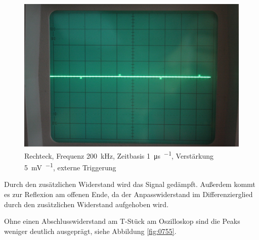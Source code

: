 \begin{figure}[htbp]
	\centering
	\begin{minipage}{.45\linewidth}
	\end{minipage}
	\hfill
	\begin{minipage}{.45\linewidth}
	\includegraphics[width=\linewidth]{Fotos/IMG_0753-1500.jpg}
	\end{minipage}
	\caption{%
		Rechteck, Frequenz \SI{200}{\kilo\hertz}, Zeitbasis \SI{1}{\micro\second\per\division}, Verstärkung \SI{5}{\milli\volt\per\division}, externe Triggerung
	}
	\label{fig:0753}
\end{figure}

Durch den zusätzlichen Widerstand wird das Signal gedämpft. Außerdem kommt es zur Reflexion am offenen Ende, da der Anpasswiderstand im Differenzierglied durch den zusätzlichen Widerstand aufgehoben wird.

Ohne einen Abschlusswiderstand am T-Stück am Oszilloskop sind die Peaks weniger deutlich ausgeprägt, siehe Abbildung \ref{fig:0755}.

